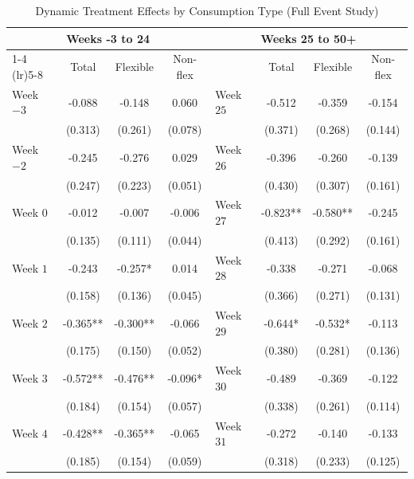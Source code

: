 \begin{table}[htbp]\centering
\caption{Dynamic Treatment Effects by Consumption Type (Full Event Study)}
\label{tab:event_study_full}
\scriptsize
\begin{tabular}{lccc lccc}
\toprule
\multicolumn{4}{c}{\textbf{Weeks -3 to 24}} & \multicolumn{4}{c}{\textbf{Weeks 25 to 50+}} \\
\cmidrule(lr){1-4} \cmidrule(lr){5-8}
 & Total & Flexible & Non-flex &  & Total & Flexible & Non-flex \\
\midrule

Week $-3$ & -0.088 & -0.148 & 0.060 & Week $25$ & -0.512 & -0.359 & -0.154 \\
          & (0.313) & (0.261) & (0.078) &           & (0.371) & (0.268) & (0.144) \\

Week $-2$ & -0.245 & -0.276 & 0.029 & Week $26$ & -0.396 & -0.260 & -0.139 \\
          & (0.247) & (0.223) & (0.051) &           & (0.430) & (0.307) & (0.161) \\

Week $0$  & -0.012 & -0.007 & -0.006 & Week $27$ & -0.823** & -0.580** & -0.245 \\
          & (0.135) & (0.111) & (0.044) &           & (0.413)  & (0.292)  & (0.161) \\

Week $1$  & -0.243 & -0.257* & 0.014 & Week $28$ & -0.338 & -0.271 & -0.068 \\
          & (0.158) & (0.136) & (0.045) &           & (0.366) & (0.271) & (0.131) \\

Week $2$  & -0.365** & -0.300** & -0.066 & Week $29$ & -0.644* & -0.532* & -0.113 \\
          & (0.175)  & (0.150)  & (0.052) &           & (0.380)  & (0.281)  & (0.136) \\

Week $3$  & -0.572** & -0.476** & -0.096* & Week $30$ & -0.489 & -0.369 & -0.122 \\
          & (0.184)  & (0.154)  & (0.057) &           & (0.338) & (0.261) & (0.114) \\

Week $4$  & -0.428** & -0.365** & -0.065 & Week $31$ & -0.272 & -0.140 & -0.133 \\
          & (0.185)  & (0.154)  & (0.059) &           & (0.318) & (0.233) & (0.125) \\


\end{tabular}
\end{table}
